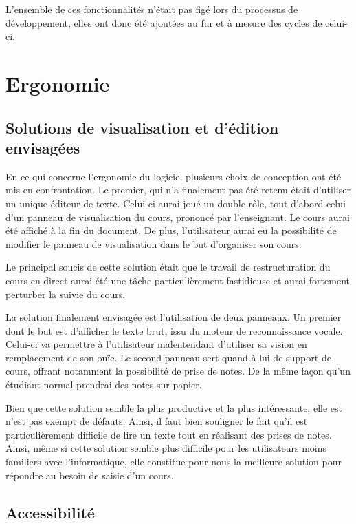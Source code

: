 L'ensemble de ces fonctionnalités n'était pas figé lors du processus de développement, elles ont donc été ajoutées au fur et à mesure des cycles de celui-ci.

\section{Ergonomie}

\subsection{Solutions de visualisation et d'édition envisagées}

En ce qui concerne l'ergonomie du logiciel plusieurs choix de conception ont été mis en confrontation. Le premier, qui n'a finalement pas été retenu était d'utiliser un unique éditeur de texte. Celui-ci aurai joué un  double rôle, tout d'abord celui d'un panneau de visualisation du cours, prononcé par l'enseignant. Le cours aurai été affiché à la fin du document. De plus, l'utilisateur aurai eu la possibilité de modifier le panneau de visualisation dans le but d'organiser son  cours.

Le principal soucis de cette solution était que le travail de restructuration du cours en direct aurai été une tâche particulièrement fastidieuse et aurai fortement perturber la suivie du cours.

La solution finalement envisagée est l'utilisation de deux panneaux. Un premier dont le but est d'afficher le texte brut, issu du moteur de reconnaissance vocale. Celui-ci  va permettre à l'utilisateur malentendant d'utiliser sa  vision en remplacement de son ouïe. Le second panneau sert quand à lui de support de cours, offrant notamment la possibilité de prise de notes. De la même façon qu'un étudiant normal prendrai des notes sur papier.

Bien que cette solution semble la plus productive et la plus intéressante, elle est n'est pas exempt de défauts. Ainsi, il faut bien souligner le fait qu'il est particulièrement difficile de lire un texte tout en réalisant des prises de notes. Ainsi, même si cette solution semble plus difficile pour les utilisateurs moins familiers avec l'informatique, elle constitue pour nous la meilleure solution pour répondre au besoin de saisie d'un cours.




\subsection{Accessibilité}

